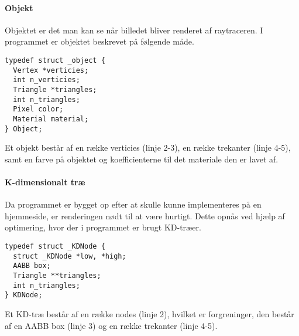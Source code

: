 \paragraph{Objekt}
Objektet er det man kan se når billedet bliver renderet af raytraceren. I programmet er objektet beskrevet på følgende måde.

\begin{lstlisting}[style=Cstyle, caption=Structs til objektet]
typedef struct _object {
  Vertex *verticies;
  int n_verticies;
  Triangle *triangles;
  int n_triangles;
  Pixel color;
  Material material;
} Object;
\end{lstlisting}

Et objekt består af en række verticies (linje 2-3), en række trekanter (linje 4-5), samt en farve på objektet og koefficienterne til det materiale den er lavet af.

\paragraph{K-dimensionalt træ}
Da programmet er bygget op efter at skulle kunne implementeres på en hjemmeside, er renderingen nødt til at være hurtigt. Dette opnås ved hjælp af optimering, hvor der i programmet er brugt KD-træer.

\begin{lstlisting}[style=Cstyle, caption=Struct til KDNode]
typedef struct _KDNode {
  struct _KDNode *low, *high;
  AABB box;
  Triangle **triangles;
  int n_triangles;
} KDNode;
\end{lstlisting}

Et KD-træ består af en række nodes (linje 2), hvilket er forgreninger, den består af en AABB box (linje 3) og en række trekanter (linje 4-5).
